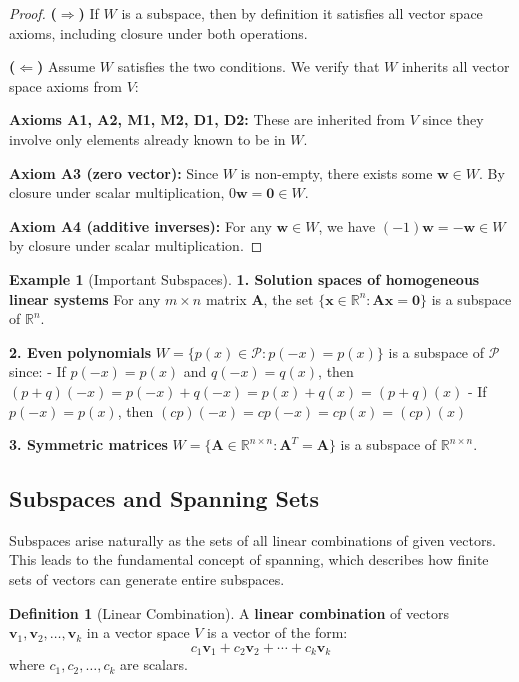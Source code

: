\documentclass[12pt]{article}
\numberwithin{equation}{section}
\newcommand{\vect}[1]{\boldsymbol{#1}}   %
\newcommand{\mat}[1]{\mathbf{#1}}        %
\theoremstyle{plain}
\theoremstyle{definition}
\newtheorem{definition}[theorem]{Definition}
\newtheorem{example}[theorem]{Example}
\theoremstyle{remark}
\begin{document}
\begin{proof}
\textbf{($\Rightarrow$)} If $W$ is a subspace, then by definition it satisfies all vector space axioms, including closure under both operations.

\textbf{($\Leftarrow$)} Assume $W$ satisfies the two conditions. We verify that $W$ inherits all vector space axioms from $V$:

\textbf{Axioms A1, A2, M1, M2, D1, D2:} These are inherited from $V$ since they involve only elements already known to be in $W$.

\textbf{Axiom A3 (zero vector):} Since $W$ is non-empty, there exists some $\vect{w} \in W$. By closure under scalar multiplication, $0\vect{w} = \vect{0} \in W$.

\textbf{Axiom A4 (additive inverses):} For any $\vect{w} \in W$, we have $(-1)\vect{w} = -\vect{w} \in W$ by closure under scalar multiplication.
\end{proof}

\begin{example}[Important Subspaces]
\textbf{1. Solution spaces of homogeneous linear systems}
For any $m \times n$ matrix $\mat{A}$, the set $\{\vect{x} \in \mathbb{R}^n : \mat{A}\vect{x} = \vect{0}\}$ is a subspace of $\mathbb{R}^n$.

\textbf{2. Even polynomials}
$W = \{p(x) \in \mathcal{P} : p(-x) = p(x)\}$ is a subspace of $\mathcal{P}$ since:
- If $p(-x) = p(x)$ and $q(-x) = q(x)$, then $(p+q)(-x) = p(-x) + q(-x) = p(x) + q(x) = (p+q)(x)$
- If $p(-x) = p(x)$, then $(cp)(-x) = cp(-x) = cp(x) = (cp)(x)$

\textbf{3. Symmetric matrices}
$W = \{\mat{A} \in \mathbb{R}^{n \times n} : \mat{A}^T = \mat{A}\}$ is a subspace of $\mathbb{R}^{n \times n}$.
\end{example}

\subsection{Subspaces and Spanning Sets}

Subspaces arise naturally as the sets of all linear combinations of given vectors. This leads to the fundamental concept of spanning, which describes how finite sets of vectors can generate entire subspaces.

\begin{definition}[Linear Combination]
A \textbf{linear combination} of vectors $\vect{v}_1, \vect{v}_2, \ldots, \vect{v}_k$ in a vector space $V$ is a vector of the form:
$$c_1\vect{v}_1 + c_2\vect{v}_2 + \cdots + c_k\vect{v}_k$$
where $c_1, c_2, \ldots, c_k$ are scalars.
\end{definition}
\end{document}

